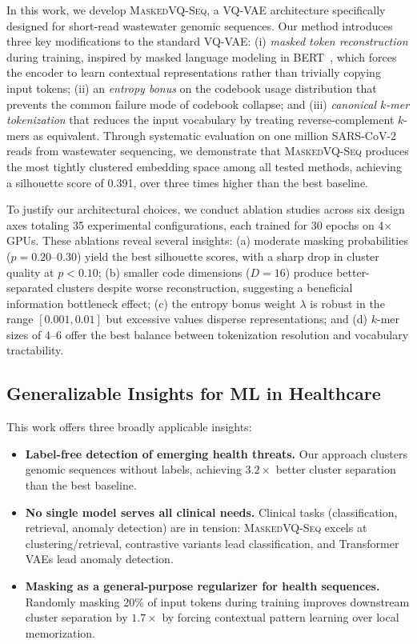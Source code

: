 \documentclass[pmlr]{jmlr}%
\newcommand{\ours}{\textsc{MaskedVQ-Seq}}
\begin{document}
In this work, we develop \ours{}, a VQ-VAE architecture specifically designed for short-read wastewater genomic sequences. Our method introduces three key modifications to the standard VQ-VAE: (i) \emph{masked token reconstruction} during training, inspired by masked language modeling in BERT~\citep{devlin2019bert}, which forces the encoder to learn contextual representations rather than trivially copying input tokens; (ii) an \emph{entropy bonus} on the codebook usage distribution that prevents the common failure mode of codebook collapse; and (iii) \emph{canonical $k$-mer tokenization} that reduces the input vocabulary by treating reverse-complement $k$-mers as equivalent. Through systematic evaluation on one million SARS-CoV-2 reads from wastewater sequencing, we demonstrate that \ours{} produces the most tightly clustered embedding space among all tested methods, achieving a silhouette score of 0.391, over three times higher than the best baseline.

To justify our architectural choices, we conduct ablation studies across six design axes totaling 35 experimental configurations, each trained for 30 epochs on 4$\times$ GPUs. These ablations reveal several insights: (a) moderate masking probabilities ($p = 0.20$--$0.30$) yield the best silhouette scores, with a sharp drop in cluster quality at $p < 0.10$; (b) smaller code dimensions ($D = 16$) produce better-separated clusters despite worse reconstruction, suggesting a beneficial information bottleneck effect; (c) the entropy bonus weight $\lambda$ is robust in the range $[0.001, 0.01]$ but excessive values disperse representations; and (d) $k$-mer sizes of 4--6 offer the best balance between tokenization resolution and vocabulary tractability.

\subsection*{Generalizable Insights for ML in Healthcare}

This work offers three broadly applicable insights:

\begin{itemize}
\item \textbf{Label-free detection of emerging health threats.} Our approach clusters genomic sequences without labels, achieving $3.2\times$ better cluster separation than the best baseline.

\item \textbf{No single model serves all clinical needs.} Clinical tasks (classification, retrieval, anomaly detection) are in tension: \ours{} excels at clustering/retrieval, contrastive variants lead classification, and Transformer VAEs lead anomaly detection.

\item \textbf{Masking as a general-purpose regularizer for health sequences.} Randomly masking 20\% of input tokens during training improves downstream cluster separation by $1.7\times$ by forcing contextual pattern learning over local memorization.
\end{itemize}
\end{document}
